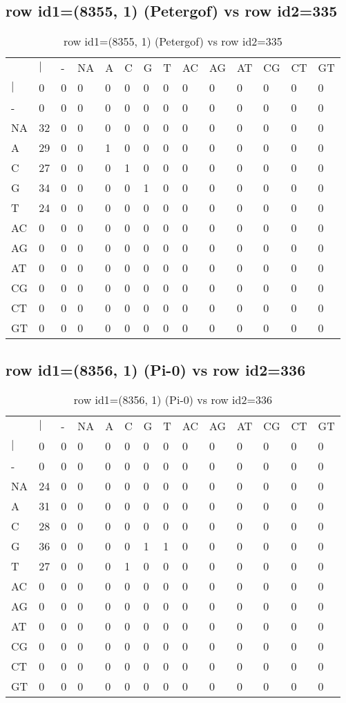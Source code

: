 \subsection{row id1=(8355, 1) (Petergof) vs row id2=335}
\begin{center}
\begin{longtable}{|l|l|l|l|l|l|l|l|l|l|l|l|l|l|}
\caption{row id1=(8355, 1) (Petergof) vs row id2=335} \label{table_dm382}\\
\hline
\\
\hline
&$|$&-&NA&A&C&G&T&AC&AG&AT&CG&CT&GT\\
$|$&0&0&0&0&0&0&0&0&0&0&0&0&0\\
-&0&0&0&0&0&0&0&0&0&0&0&0&0\\
NA&32&0&0&0&0&0&0&0&0&0&0&0&0\\
A&29&0&0&1&0&0&0&0&0&0&0&0&0\\
C&27&0&0&0&1&0&0&0&0&0&0&0&0\\
G&34&0&0&0&0&1&0&0&0&0&0&0&0\\
T&24&0&0&0&0&0&0&0&0&0&0&0&0\\
AC&0&0&0&0&0&0&0&0&0&0&0&0&0\\
AG&0&0&0&0&0&0&0&0&0&0&0&0&0\\
AT&0&0&0&0&0&0&0&0&0&0&0&0&0\\
CG&0&0&0&0&0&0&0&0&0&0&0&0&0\\
CT&0&0&0&0&0&0&0&0&0&0&0&0&0\\
GT&0&0&0&0&0&0&0&0&0&0&0&0&0\\
\hline
\end{longtable}
\end{center}

\subsection{row id1=(8356, 1) (Pi-0) vs row id2=336}
\begin{center}
\begin{longtable}{|l|l|l|l|l|l|l|l|l|l|l|l|l|l|}
\caption{row id1=(8356, 1) (Pi-0) vs row id2=336} \label{table_dm384}\\
\hline
\\
\hline
&$|$&-&NA&A&C&G&T&AC&AG&AT&CG&CT&GT\\
$|$&0&0&0&0&0&0&0&0&0&0&0&0&0\\
-&0&0&0&0&0&0&0&0&0&0&0&0&0\\
NA&24&0&0&0&0&0&0&0&0&0&0&0&0\\
A&31&0&0&0&0&0&0&0&0&0&0&0&0\\
C&28&0&0&0&0&0&0&0&0&0&0&0&0\\
G&36&0&0&0&0&1&1&0&0&0&0&0&0\\
T&27&0&0&0&1&0&0&0&0&0&0&0&0\\
AC&0&0&0&0&0&0&0&0&0&0&0&0&0\\
AG&0&0&0&0&0&0&0&0&0&0&0&0&0\\
AT&0&0&0&0&0&0&0&0&0&0&0&0&0\\
CG&0&0&0&0&0&0&0&0&0&0&0&0&0\\
CT&0&0&0&0&0&0&0&0&0&0&0&0&0\\
GT&0&0&0&0&0&0&0&0&0&0&0&0&0\\
\hline
\end{longtable}
\end{center}

